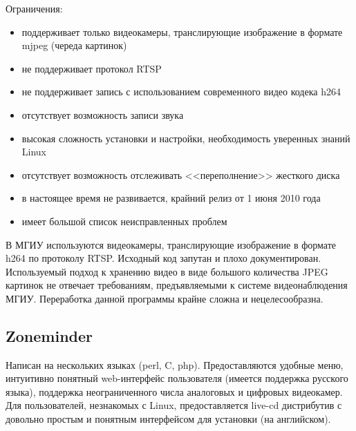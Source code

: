 \medskip

Ограничения:
\smallskip
\begin{itemize}
	\item
	поддерживает только видеокамеры, транслирующие изображение в формате mjpeg (череда картинок)
	\item не поддерживает протокол RTSP
	\item не поддерживает запись с использованием современного видео кодека h264
	\item отсутствует возможность записи звука
	\item высокая сложность установки и настройки, необходимость уверенных знаний Linux
	\item отсутствует возможность отслеживать <<переполнение>> жесткого диска
	\item в настоящее время не развивается, крайний релиз от 1 июня 2010 года
	\item имеет большой список неисправленных проблем
\end{itemize}

\medskip

В МГИУ используются видеокамеры, транслирующие изображение в формате h264 по протоколу RTSP.
Исходный код запутан и плохо документирован.
Используемый подход к хранению видео в виде большого количества JPEG картинок не
отвечает требованиям, предъявляемыми к системе видеонаблюдения МГИУ.
Переработка данной программы крайне сложна и нецелесообразна.

\subsection{Zoneminder}

Написан на нескольких языках (perl, C, php).
Предоставляются удобные меню, интуитивно понятный web-интерфейс пользователя
(имеется поддержка русского языка), поддержка неограниченного числа аналоговых
и цифровых видеокамер. Для пользователей, незнакомых с Linux, предоставляется live-cd
дистрибутив с довольно простым и понятным интерфейсом для установки (на английском).

\medskip

